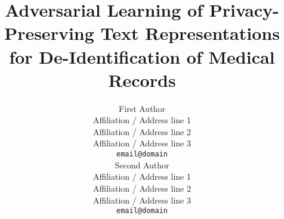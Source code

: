 \documentclass[11pt,a4paper]{article}
\title{Adversarial Learning of Privacy-Preserving Text Representations for De-Identification of Medical Records}
\author{First Author \\
    Affiliation / Address line 1 \\
    Affiliation / Address line 2 \\
    Affiliation / Address line 3 \\
    {\tt email@domain} \\\And
    Second Author \\
    Affiliation / Address line 1 \\
    Affiliation / Address line 2 \\
    Affiliation / Address line 3 \\
    {\tt email@domain} \\}
\date{}
\begin{document}
\maketitle


\acresetall





\end{document}

